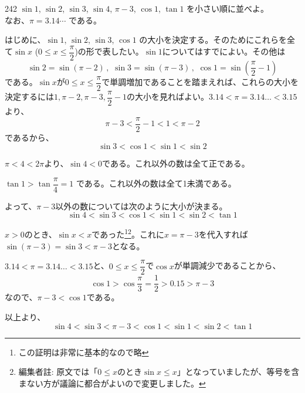 \begin{prob}{242}{}{}
 $\sin 1$, $\sin 2$, $\sin 3$, $\sin 4$, $\pi-3$, $\cos 1$, $\tan 1$ を小さい順に並べよ。\\
 なお、$\pi=3.14\cdots$ である。
\end{prob}
はじめに、$\sin 1$, $\sin 2$, $\sin 3$, $\cos 1$ の大小を決定する。そのためにこれらを全て$\sin x$ ($0\le x\le \dfrac{\pi}{2}$)の形で表したい。$\sin 1$についてはすでによい。その他は
\[ \sin 2=\sin (\pi-2) \,,\,\, \sin 3=\sin (\pi-3) \,,\,\, \cos 1=\sin \left(\frac{\pi}{2}-1\right) \]
である。$\sin x$が$0\le x\le \dfrac{\pi}{2}$で単調増加であることを踏まえれば、これらの大小を決定するには$1, \pi-2, \pi-3, \dfrac{\pi}{2}-1$の大小を見ればよい。$3.14<\pi=3.14\dots <3.15$より、
\[ \pi-3 < \frac{\pi}{2}-1 < 1 < \pi-2 \]
であるから、
\[ \sin 3 < \cos 1 < \sin 1 < \sin 2 \]

$\pi < 4 < 2\pi$より、$\sin 4 < 0$である。これ以外の数は全て正である。

$\tan 1 > \tan\dfrac{\pi}{4}=1$ である。これ以外の数は全て1未満である。

よって、$\pi-3$以外の数については次のように大小が決まる。
\[ \sin 4 < \sin 3 < \cos 1 < \sin 1 < \sin 2 < \tan 1 \]

$x > 0$のとき、$\sin x < x$であった\footnote{この証明は非常に基本的なので略}\footnote{編集者註: 原文では「$0\le x$のとき$\sin x\le x$」となっていましたが、等号を含まない方が議論に都合がよいので変更しました。}。これに$x=\pi-3$を代入すれば$\sin (\pi-3)=\sin 3 < \pi -3$となる。

$3.14<\pi=3.14\dots <3.15$と、$0\le x\le \dfrac{\pi}{2}$で$\cos x$が単調減少であることから、
\[ \cos 1 > \cos \frac{\pi}{3}=\frac{1}{2} > 0.15 > \pi -3 \]
なので、$\pi -3 < \cos 1$である。

以上より、
\[ \sin 4 < \sin 3 < \pi -3 < \cos 1 < \sin 1 < \sin 2 < \tan 1 \]